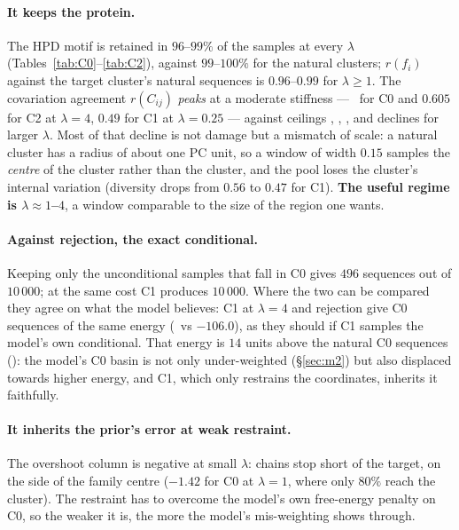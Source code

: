 \paragraph{It keeps the protein.} The HPD motif is retained in $96$--$99\%$ of the samples at every
$\lambda$ (Tables~\ref{tab:C0}--\ref{tab:C2}), against $99$--$100\%$ for the natural clusters;
$r(f_i)$ against the target cluster's natural sequences is $0.96$--$0.99$ for $\lambda\ge1$.
The covariation agreement $r(C_{ij})$ \emph{peaks} at a moderate stiffness --- \ConeALfourrC\ for C0
and $0.605$ for C2 at $\lambda=4$, $0.49$ for C1 at $\lambda=0.25$ --- against ceilings \CeilA,
\CeilB, \CeilC, and declines for larger $\lambda$. Most of that decline is not damage but a mismatch
of scale: a natural cluster has a radius of about one PC unit, so a window of width $0.15$ samples
the \emph{centre} of the cluster rather than the cluster, and the pool loses the cluster's internal
variation (diversity drops from $0.56$ to $0.47$ for C1). \textbf{The useful regime is
$\lambda\approx1$--$4$}, a window comparable to the size of the region one wants.

\paragraph{Against rejection, the exact conditional.} Keeping only the unconditional samples that
fall in C0 gives $496$ sequences out of $10\,000$; at the same cost C1 produces $10\,000$. Where the
two can be compared they agree on what the model believes: C1 at $\lambda=4$ and rejection give C0
sequences of the same energy (\ConeALfourE\ vs $-106.0$), as they should if C1 samples the model's
own conditional. That energy is $14$ units above the natural C0 sequences (\NatEA): the model's C0
basin is not only under-weighted (\S\ref{sec:m2}) but also displaced towards higher energy, and C1,
which only restrains the coordinates, inherits it faithfully.

\paragraph{It inherits the prior's error at weak restraint.} The overshoot column is negative at
small $\lambda$: chains stop short of the target, on the side of the family centre ($-1.42$ for C0
at $\lambda=1$, where only $80\%$ reach the cluster). The restraint has to overcome the model's own
free-energy penalty on C0, so the weaker it is, the more the model's mis-weighting shows through.

